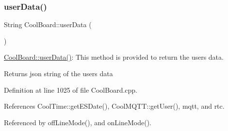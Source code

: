 \subsubsection{\texorpdfstring{user\+Data()}{userData()}}
{\footnotesize\ttfamily String Cool\+Board\+::user\+Data (\begin{DoxyParamCaption}{ }\end{DoxyParamCaption})}

\hyperlink{classCoolBoard_ae7358fb6e623cfc81b775f5f1734909b}{Cool\+Board\+::user\+Data()}\+: This method is provided to return the user\textquotesingle{}s data.

\begin{DoxyReturn}{Returns}
json string of the user\textquotesingle{}s data 
\end{DoxyReturn}


Definition at line 1025 of file Cool\+Board.\+cpp.



References Cool\+Time\+::get\+E\+S\+Date(), Cool\+M\+Q\+T\+T\+::get\+User(), mqtt, and rtc.



Referenced by off\+Line\+Mode(), and on\+Line\+Mode().


